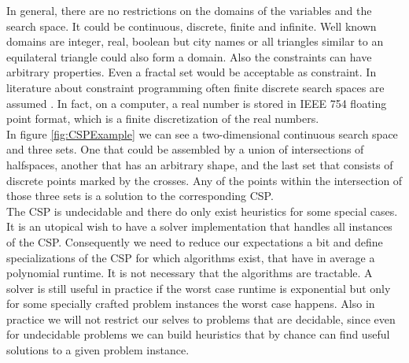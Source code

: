 In general, there are no restrictions on the domains of the variables and the search space. It could be continuous, discrete, finite and infinite. Well known domains are integer, real, boolean but city names or all triangles similar to an equilateral triangle could also form a domain. Also the constraints can have arbitrary properties. Even a fractal set would be acceptable as constraint. In literature about constraint programming often finite discrete search spaces are assumed \cite{Citation Needed}. In fact, on a computer, a real number is stored in IEEE 754 floating point format, which is a finite discretization of the real numbers. \\
In figure \ref{fig:CSPExample} we can see a two-dimensional continuous search space and three sets. One that could be assembled by a union of intersections of halfspaces, another that has an arbitrary shape, and the last set that consists of discrete points marked by the crosses. Any of the points within the intersection of those three sets is a solution to the corresponding CSP.\\
The CSP is undecidable and there do only exist heuristics for some special cases. It is an utopical wish to have a solver implementation that handles all instances of the CSP. Consequently we need to reduce our expectations a bit and define specializations of the CSP for which algorithms exist, that have in average a polynomial runtime. It is not necessary that the algorithms are tractable. A solver is still useful in practice if the worst case runtime is exponential but only for some specially crafted problem instances the worst case happens. Also in practice we will not restrict our selves to problems that are decidable, since even for undecidable problems we can build heuristics that by chance can find useful solutions to a given problem instance.

